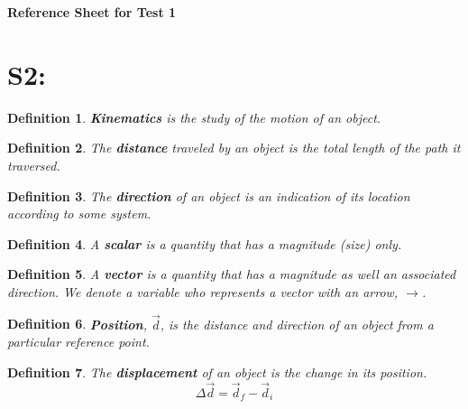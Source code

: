 \documentclass[12pt]{article}
\theoremstyle{break}
\newtheorem*{defn}{Definition}[subsection]
\begin{document}
\let\ref\Cref

\begin{center}
	\LARGE{\textbf{Reference Sheet for Test 1}}
\end{center}


\section{S2:}

\begin{defn}
	\textbf{Kinematics} is the study of the motion of an object.
\end{defn}

\begin{defn}
The \textbf{distance} traveled by an object is the total length of the path it traversed.
\end{defn}


\begin{defn}
The \textbf{direction} of an object is an indication of its location according to some system.
\end{defn}

\begin{defn}
	A \textbf{scalar} is a quantity that has a magnitude (size) \emph{only}.
	\end{defn}

\begin{defn}
	A \textbf{vector} is a quantity that has a magnitude as well an associated direction. We denote a variable who represents a vector with an arrow, $\rightarrow$.
\end{defn}

\begin{defn}
	\textbf{Position}, $\vec d$, is the distance and direction of an object from a particular \emph{reference point}.
\end{defn}

\begin{defn}
    The \textbf{displacement} of an object is the change in its position. $$\Delta \vec d = \vec d_{f} - \vec d_{i}$$
\end{defn}
\end{document}
